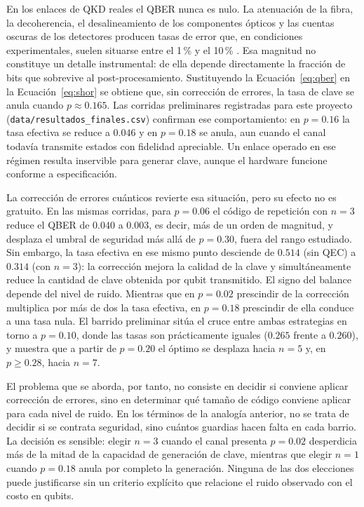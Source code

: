 \documentclass[12pt]{report}
\begin{document}
En los enlaces de QKD reales el QBER nunca es nulo. La atenuación de la fibra, la
decoherencia, el desalineamiento de los componentes ópticos y las cuentas oscuras
de los detectores producen tasas de error que, en condiciones experimentales,
suelen situarse entre el 1\,\% y el 10\,\% \citep{xu2020, scarani2009}. Esa
magnitud no constituye un detalle instrumental: de ella depende directamente la
fracción de bits que sobrevive al post-procesamiento. Sustituyendo la
Ecuación~\eqref{eq:qber} en la Ecuación~\eqref{eq:shor} se obtiene que, sin
corrección de errores, la tasa de clave se anula cuando $p \approx 0.165$. Las
corridas preliminares registradas para este proyecto
(\texttt{data/resultados\_finales.csv}) confirman ese comportamiento: en
$p = 0.16$ la tasa efectiva se reduce a $0.046$ y en $p = 0.18$ se anula,
aun cuando el canal todavía transmite estados con fidelidad apreciable. Un enlace
operado en ese régimen resulta inservible para generar clave, aunque el hardware
funcione conforme a especificación.

La corrección de errores cuánticos revierte esa situación, pero su efecto no es
gratuito. En las mismas corridas, para $p = 0.06$ el código de repetición con
$n = 3$ reduce el QBER de $0.040$ a $0.003$, es decir, más de un orden de
magnitud, y desplaza el umbral de seguridad más allá de $p = 0.30$, fuera del
rango estudiado. Sin embargo, la tasa efectiva en ese mismo punto desciende de
$0.514$ (sin QEC) a $0.314$ (con $n = 3$): la corrección mejora la calidad de
la clave y simultáneamente reduce la cantidad de clave obtenida por qubit
transmitido. El signo del balance depende del nivel de ruido. Mientras que en
$p = 0.02$ prescindir de la corrección multiplica por más de dos la tasa
efectiva, en $p = 0.18$ prescindir de ella conduce a una tasa nula. El barrido
preliminar sitúa el cruce entre ambas estrategias en torno a $p = 0.10$, donde
las tasas son prácticamente iguales ($0.265$ frente a $0.260$), y muestra que
a partir de $p = 0.20$ el óptimo se desplaza hacia $n = 5$ y, en $p \geq 0.28$,
hacia $n = 7$.

El problema que se aborda, por tanto, no consiste en decidir si conviene aplicar
corrección de errores, sino en determinar qué tamaño de código conviene aplicar
para cada nivel de ruido. En los términos de la analogía anterior, no se trata de
decidir si se contrata seguridad, sino cuántos guardias hacen falta en cada
barrio. La decisión es sensible: elegir $n = 3$ cuando el canal
presenta $p = 0.02$ desperdicia más de la mitad de la capacidad de generación
de clave, mientras que elegir $n = 1$ cuando $p = 0.18$ anula por completo la
generación. Ninguna de las dos elecciones puede justificarse sin un criterio
explícito que relacione el ruido observado con el costo en qubits.
\end{document}
